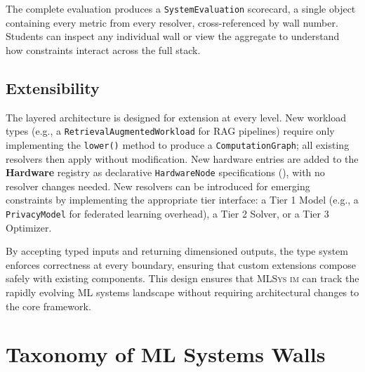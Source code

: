 \documentclass[10pt,twocolumn]{article}
\newcommand{\mlsysim}{\mbox{\textsc{MLSys}\,\textperiodcentered\,\textsc{im}}\xspace}
\begin{document}
The complete evaluation produces a \texttt{SystemEvaluation} scorecard, a single object containing every metric from every resolver, cross-referenced by wall number. Students can inspect any individual wall or view the aggregate to understand how constraints interact across the full stack.

\subsection{Extensibility}
\label{sec:extensibility}

The layered architecture is designed for extension at every level. New workload types (e.g., a \texttt{RetrievalAugmentedWorkload} for RAG pipelines) require only implementing the \texttt{lower()} method to produce a \texttt{ComputationGraph}; all existing resolvers then apply without modification. New hardware entries are added to the \textbf{Hardware} registry as declarative \texttt{HardwareNode} specifications (), with no resolver changes needed. New resolvers can be introduced for emerging constraints by implementing the appropriate tier interface: a Tier 1 Model (e.g., a \texttt{PrivacyModel} for federated learning overhead), a Tier 2 Solver, or a Tier 3 Optimizer.

By accepting typed inputs and returning dimensioned outputs, the type system enforces correctness at every boundary, ensuring that custom extensions compose safely with existing components. This design ensures that \mlsysim can track the rapidly evolving ML systems landscape without requiring architectural changes to the core framework.

\section{Taxonomy of ML Systems Walls}
\label{sec:taxonomy}
\end{document}
